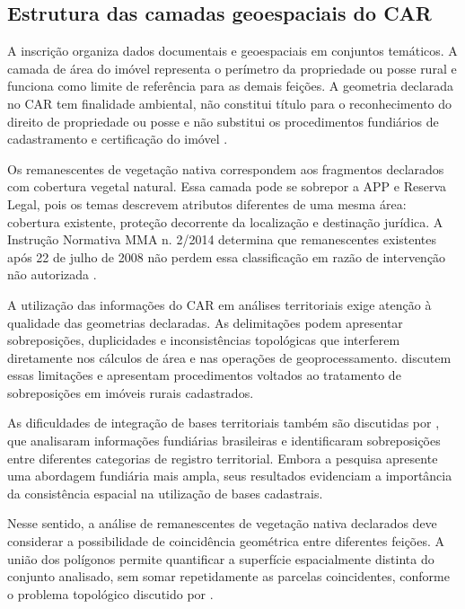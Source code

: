 \subsection{Estrutura das camadas geoespaciais do CAR}

A inscrição organiza dados documentais e geoespaciais em conjuntos temáticos. A camada de área do imóvel representa o perímetro da propriedade ou posse rural e funciona como limite de referência para as demais feições. A geometria declarada no CAR tem finalidade ambiental, não constitui título para o reconhecimento do direito de propriedade ou posse e não substitui os procedimentos fundiários de cadastramento e certificação do imóvel \cite[art. 29, \S~2º]{brasil2012}.

Os remanescentes de vegetação nativa correspondem aos fragmentos declarados com cobertura vegetal natural. Essa camada pode se sobrepor a APP e Reserva Legal, pois os temas descrevem atributos diferentes de uma mesma área: cobertura existente, proteção decorrente da localização e destinação jurídica. A Instrução Normativa MMA n. 2/2014 determina que remanescentes existentes após 22 de julho de 2008 não perdem essa classificação em razão de intervenção não autorizada \cite{mma2014}.

A utilização das informações do CAR em análises territoriais exige atenção à qualidade das geometrias declaradas. As delimitações podem apresentar sobreposições, duplicidades e inconsistências topológicas que interferem diretamente nos cálculos de área e nas operações de geoprocessamento.  discutem essas limitações e apresentam procedimentos voltados ao tratamento de sobreposições em imóveis rurais cadastrados.

As dificuldades de integração de bases territoriais também são discutidas por , que analisaram informações fundiárias brasileiras e identificaram sobreposições entre diferentes categorias de registro territorial. Embora a pesquisa apresente uma abordagem fundiária mais ampla, seus resultados evidenciam a importância da consistência espacial na utilização de bases cadastrais.

Nesse sentido, a análise de remanescentes de vegetação nativa declarados deve considerar a possibilidade de coincidência geométrica entre diferentes feições. A união dos polígonos permite quantificar a superfície espacialmente distinta do conjunto analisado, sem somar repetidamente as parcelas coincidentes, conforme o problema topológico discutido por .

